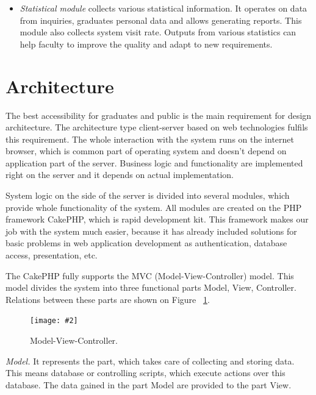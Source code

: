 \documentclass{iitsrc}[2006/14/02]
\newcommand\fig[4]{%
	\begin{figure}[h]
	\begin{center}
	\texttt{[image: \#2]}
	~\\%
	\caption{#4}
	\label{#3}
	\end{center}
	\end{figure}
}
\begin{document}
\begin{itemize}
\item {\em Statistical module}
collects various statistical information. It operates on data from inquiries, graduates personal data and allows generating reports. This module also collects system visit rate. Outputs from various statistics can help faculty to improve the quality and adapt to new requirements.

\end{itemize}

\section{Architecture}

The best accessibility for graduates and public is the main requirement for design architecture. The architecture type client-server based on web technologies fulfils this requirement. The whole interaction with the system runs on the internet browser, which is common part of operating system and doesn't depend on application part of the server. Business logic and functionality are implemented right on the server and it depends on actual implementation.

System logic on the side of the server is divided into several modules, which provide whole functionality of the system. All modules are created on the PHP framework CakePHP, which is rapid development kit. This framework makes our job with the system much easier, because it has already included solutions for basic problems in web application development as authentication, database access, presentation, etc.

The CakePHP fully supports the MVC (Model-View-Controller) model\cite{cakephp}. This model divides the system into three functional parts Model, View, Controller. Relations between these parts are shown on Figure ~\ref{fig:mvc}.


\fig{width=8cm}{images/mvc}{fig:mvc}{Model-View-Controller.}

{\em Model.} It represents the part, which takes care of collecting and storing data. This means database or controlling scripts, which execute actions over this database. The data gained in the part Model are provided to the part View.
\end{document}
